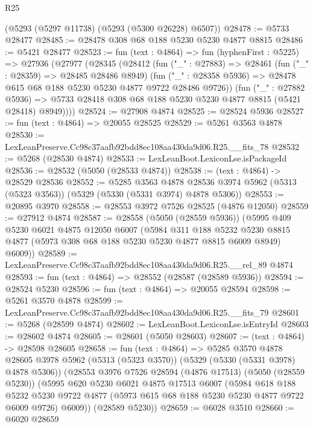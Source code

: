 \begin{lexlean}{R25}
\begin{coremodule}
    (@5293 (@5297 @11738) (@5293 (@5300 @26228) @6507))
@28478 := @5733 @28477
@28485 := @28478 @308 @68 @188 @5230 @5230 @4877 @8815
@28486 := @5421 @28477
@28523 := fun (text : @4864) =>
  fun (hyphenFirst : @5225) =>
  @27936
    (@27977
      (@28345
        (@28412
          (fun ("_" : @27883) =>
          @28461
            (fun ("_" : @28359) => @28485 @28486 @8949)
            (fun ("_" : @28358 @5936) => @28478 @615 @68 @188 @5230 @5230 @4877 @9722 @28486 @9726))
          (fun ("_" : @27882 @5936) =>
          @5733 @28418 @308 @68 @188 @5230 @5230 @4877 @8815 (@5421 @28418) @8949))))
@28524 := @27908 @4874
@28525 := @28524 @5936
@28527 := fun (text : @4864) => @20055 @28525
@28529 := @5261 @3563 @4878
@28530 := LexLeanPreserve.Cc98c37aafb92bdd8ec108aa430da9d06.R25.__fits_78
@28532 := @5268 (@28530 @4874)
@28533 := LexLeanBoot.LexiconLse.isPackageId
@28536 := @28532 (@5050 (@28533 @4874))
@28538 := (text : @4864) -> @28529 @28536
@28552 := @5285
    @3563
    @4878
    @28536
    @3974
    @5962
    (@5313 (@5323 @3563))
    (@5329 (@5330 (@5331 @3974) @4878 @5306))
@28553 := @20895 @3970
@28558 := @28553 @3972 @7526 @28525 (@4876 @12050)
@28559 := @27912 @4874
@28587 := @28558
    (@5050 (@28559 @5936))
    (@5995
      @409
      @5230
      @6021
      @4875
      @12050
      @6007
      (@5984
        @311
        @188
        @5232
        @5230
        @8815
        @4877
        (@5973 @308 @68 @188 @5230 @5230 @4877 @8815 @6009 @8949)
        @6009))
@28589 := LexLeanPreserve.Cc98c37aafb92bdd8ec108aa430da9d06.R25.__rel_89 @4874
@28593 := fun (text : @4864) => @28552 (@28587 (@28589 @5936))
@28594 := @28524 @5230
@28596 := fun (text : @4864) => @20055 @28594
@28598 := @5261 @3570 @4878
@28599 := LexLeanPreserve.Cc98c37aafb92bdd8ec108aa430da9d06.R25.__fits_79
@28601 := @5268 (@28599 @4874)
@28602 := LexLeanBoot.LexiconLse.isEntryId
@28603 := @28602 @4874
@28605 := @28601 (@5050 @28603)
@28607 := (text : @4864) -> @28598 @28605
@28658 := fun (text : @4864) =>
  @5285
    @3570
    @4878
    @28605
    @3978
    @5962
    (@5313 (@5323 @3570))
    (@5329 (@5330 (@5331 @3978) @4878 @5306))
    (@28553
      @3976
      @7526
      @28594
      (@4876 @17513)
      (@5050 (@28559 @5230))
      (@5995
        @620
        @5230
        @6021
        @4875
        @17513
        @6007
        (@5984
          @618
          @188
          @5232
          @5230
          @9722
          @4877
          (@5973 @615 @68 @188 @5230 @5230 @4877 @9722 @6009 @9726)
          @6009))
      (@28589 @5230))
@28659 := @6028 @3510
@28660 := @6020 @28659

\end{coremodule}
\end{lexlean}
